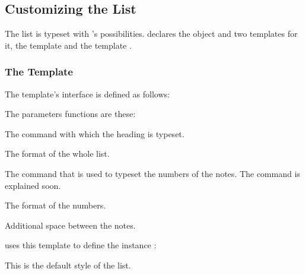 \documentclass[toc=bib,toc=index]{cnpkgdoc}
\begin{document}
\subsection{Customizing the List}\label{ssec:customizing_the_list}
The list is typeset with 's possibilities.  \enotez declares
the object  and two templates for it, the template
 and the template .

\subsubsection{The  Template}
The  template's interface is defined as follows:
The parameters functions are these:
\begin{description}[style=nextline]
  \item[\code{heading}] The command with which the heading is typeset.
  \item[\code{format}] The format of the whole list.
  \item[\code{number}] The command that is used to typeset the numbers of the
    notes.  The command  is explained soon.
  \item[\code{numbers-format}] The format of the numbers.
  \item[\code{notes-sep}] Additional space between the notes.
\end{description}

\enotez uses this template to define the instance :
\begin{beispiel}
\end{beispiel}
This is the default style of the list.
\end{document}

